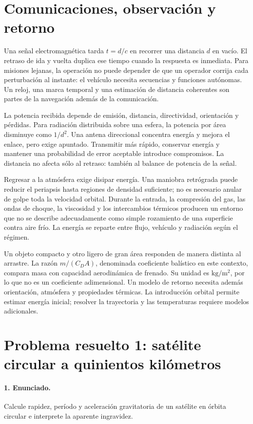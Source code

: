 \section{Comunicaciones, observación y retorno}
Una señal electromagnética tarda $t=d/c$ en recorrer una distancia $d$ en vacío. El retraso de ida y vuelta duplica ese tiempo cuando la respuesta es inmediata. Para misiones lejanas, la operación no puede depender de que un operador corrija cada perturbación al instante: el vehículo necesita secuencias y funciones autónomas. Un reloj, una marca temporal y una estimación de distancia coherentes son partes de la navegación además de la comunicación.

La potencia recibida depende de emisión, distancia, directividad, orientación y pérdidas. Para radiación distribuida sobre una esfera, la potencia por área disminuye como $1/d^2$. Una antena direccional concentra energía y mejora el enlace, pero exige apuntado. Transmitir más rápido, conservar energía y mantener una probabilidad de error aceptable introduce compromisos. La distancia no afecta sólo al retraso: también al balance de potencia de la señal.

Regresar a la atmósfera exige disipar energía. Una maniobra retrógrada puede reducir el periapsis hasta regiones de densidad suficiente; no es necesario anular de golpe toda la velocidad orbital. Durante la entrada, la compresión del gas, las ondas de choque, la viscosidad y los intercambios térmicos producen un entorno que no se describe adecuadamente como simple rozamiento de una superficie contra aire frío. La energía se reparte entre flujo, vehículo y radiación según el régimen.

Un objeto compacto y otro ligero de gran área responden de manera distinta al arrastre. La razón $m/(C_DA)$, denominada coeficiente balístico en este contexto, compara masa con capacidad aerodinámica de frenado. Su unidad es $\mathrm{kg/m^2}$, por lo que no es un coeficiente adimensional. Un modelo de retorno necesita además orientación, atmósfera y propiedades térmicas. La introducción orbital permite estimar energía inicial; resolver la trayectoria y las temperaturas requiere modelos adicionales.

\section{Problema resuelto 1: satélite circular a quinientos kilómetros}
\paragraph{1. Enunciado.} Calcule rapidez, período y aceleración gravitatoria de un satélite en órbita circular e interprete la aparente ingravidez.
